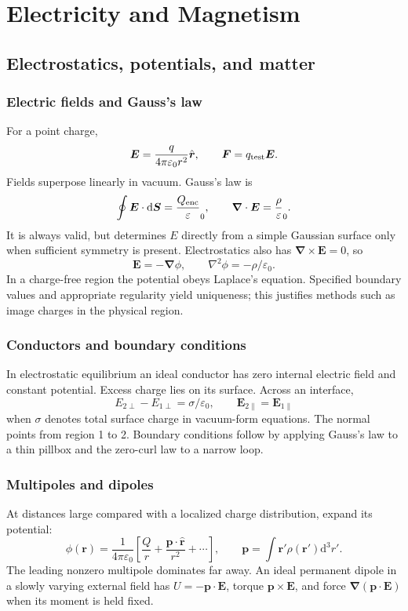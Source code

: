\documentclass[11pt,oneside]{book}
\newcommand{\dd}{\mathrm{d}}
\newcommand{\vect}[1]{\boldsymbol{#1}}
\newcommand{\grad}{\boldsymbol{\nabla}}
\newcommand{\lap}{\nabla^2}
\newcommand{\eps}{\varepsilon_0}
\theoremstyle{reviewstyle}
\begin{document}
\part{Electricity and Magnetism}
\chapter{Electrostatics, potentials, and matter}
\section{Electric fields and Gauss's law}
For a point charge,
\begin{equation}
\vect E=\frac{q}{4\pi\eps r^2}\hat{\vect r},\qquad \vect F=q_{\rm test}\vect E.
\end{equation}
Fields superpose linearly in vacuum. Gauss's law is
\begin{equation}\oint\vect E\cdot\dd\vect S=\frac{Q_{\rm enc}}\eps,\qquad \grad\cdot\vect E=\frac\rho\eps.\end{equation}
It is always valid, but determines $E$ directly from a simple Gaussian surface only when sufficient symmetry is present. Electrostatics also has $\grad\times\vect E=0$, so
\begin{equation}\vect E=-\grad\phi,\qquad \lap\phi=-\rho/\eps.\end{equation}
In a charge-free region the potential obeys Laplace's equation. Specified boundary values and appropriate regularity yield uniqueness; this justifies methods such as image charges in the physical region.
\section{Conductors and boundary conditions}
In electrostatic equilibrium an ideal conductor has zero internal electric field and constant potential. Excess charge lies on its surface. Across an interface,
\begin{equation}E_{2\perp}-E_{1\perp}=\sigma/\eps,\qquad \vect E_{2\parallel}=\vect E_{1\parallel}\end{equation}
when $\sigma$ denotes total surface charge in vacuum-form equations. The normal points from region 1 to 2. Boundary conditions follow by applying Gauss's law to a thin pillbox and the zero-curl law to a narrow loop.
\section{Multipoles and dipoles}
At distances large compared with a localized charge distribution, expand its potential:
\begin{equation}
\phi(\vect r)=\frac1{4\pi\eps}\left[\frac Qr+\frac{\vect p\cdot\hat{\vect r}}{r^2}+\cdots\right],\qquad
\vect p=\int\vect r'\rho(\vect r')\dd^3r'.
\end{equation}
The leading nonzero multipole dominates far away. An ideal permanent dipole in a slowly varying external field has $U=-\vect p\cdot\vect E$, torque $\vect p\times\vect E$, and force $\grad(\vect p\cdot\vect E)$ when its moment is held fixed.
\end{document}
